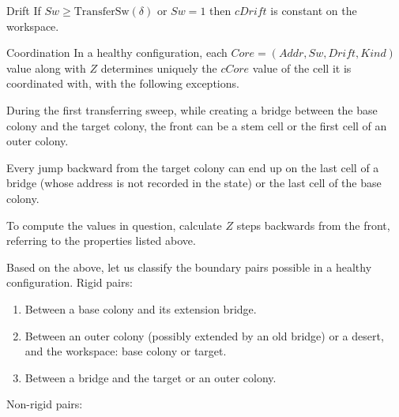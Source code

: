 \documentclass[12pt]{memoir}
\newcommand{\fld}[1]{\ensuremath{\textit{#1}}}
\newcommand{\Z}{Z}
\newcommand{\Addr}{\fld{Addr}}
\newcommand{\Core}{\fld{Core}}
\newcommand{\cCore}{\fld{cCore}}
\newcommand{\Drift}{\fld{Drift}}
\newcommand{\cDrift}{\fld{cDrift}}
\newcommand{\Info}{\fld{Info}}
\newcommand{\Kind}{\fld{Kind}}
\newcommand{\State}{\fld{State}}
\newcommand{\Sweep}{\fld{Sw}}
\newcommand{\TransferSw}{\mathrm{TransferSw}}
\begin{document}
\begin{definition}
\begin{flushdescription}





        \item[Drift]%
         If \( \Sweep \ge \TransferSw(\delta) \) or \( \Sweep=1 \) then \( \cDrift \)
         is constant on the workspace.

\item[Coordination]
 In a healthy configuration, each \( \Core =(\Addr, \Sweep, \Drift, \Kind) \) 
 value along with \( \Z \) determines uniquely the 
\( \cCore \) value of the cell it is coordinated with, with the following exceptions.
\begin{bullets}
\item During the first transferring sweep, while
    creating a bridge between the base colony and the target colony, 
    the front can be a stem cell or the first cell of an outer colony.
 \item Every jump backward from the target colony can end up on the last cell of a 
   bridge (whose address is not recorded in the state) or the last cell of the base colony.
\end{bullets}
 To compute the values in question, calculate \( \Z \) steps backwards from the front,
referring to the properties listed above.

   \end{flushdescription}
 \end{definition}

Based on the above, let us classify the boundary pairs possible in a healthy configuration.
Rigid pairs:

\begin{enumerate}[(r1)]
\item\label{i:rigid.base-bridge} Between a base colony and its extension bridge.
\item\label{i:rigid.outer-workspace}
Between an outer colony (possibly extended by an old bridge)
or a desert, and the workspace: base colony or target.
\item\label{i:rigid.bridge-target} Between a bridge and the target or an outer colony.
\end{enumerate}

Non-rigid pairs:
\end{document}
